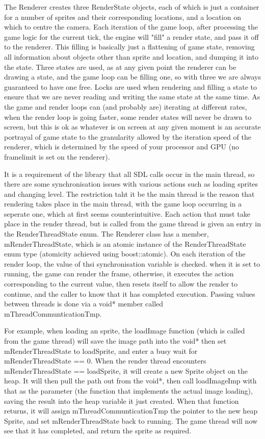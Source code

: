     The Renderer creates three RenderState objects, each of which is just a container for a number of sprites and their corresponding locations, and a location on which to centre the camera.
    Each iteration of the game loop, after processing the game logic for the current tick, the engine will "fill" a render state, and pass it off to the renderer. This filling is basically just a flattening of game state, removing all information about objects other than sprite and location, and dumping it into the state.
    Three states are used, as at any given point the renderer can be drawing a state, and the game loop can be filling one, so with three we are always guaranteed to have one free.
    Locks are used when rendering and filling a state to ensure that we are never reading and writing the same state at the same time.
    As the game and render loops can (and probably are) iterating at different rates, when the render loop is going faster, some render states will never be drawn to screen, but this is ok as whatever is on screen at any given moment is an accurate portrayal of game state to the granularity allowed by the iteration speed of the renderer, which is determined by the speed of your processor and GPU (no framelimit is set on the renderer).
    
    \mbox{}
    
    It is a requirement of the library that all SDL calls occur in the main thread, so there are some synchronisation issues with various actions such as loading sprites and changing level. The restriction taht it be the main thread is the reason that rendering takes place in the main thread, with the game loop occurring in a seperate one, which at first seems counterintuitive.
    Each action that must take place in the render thread, but is called from the game thread is given an entry in the RenderThreadState enum. The Renderer class has a member, mRenderThreadState, which is an atomic instance of the RenderThreadState enum type (atomicity achieved using boost::atomic). On each iteration of the render loop, the value of thsi synchronisation variable is checked. when it is set to running, the game can render the frame, otherwise, it executes the action corresponding to the current value, then resets itself to allow the render to continue, and the caller to know that it has completed execution. Passing values between threads is done via a void* member called mThreadCommunticationTmp.
    
    For example, when loading an sprite, the loadImage function (which is called from the game thread) will save the image path into the void* then set mRenderThreadState to loadSprite, and enter a busy wait for mRenderThreadState == 0.
    When the render thread encounters mRenderThreadState == loadSprite, it will create a new Sprite object on the heap. It will then pull the path out from  the void*, then call loadImageImp with that as the parameter (the function that implements the actual image loading), saving the result into the heap variable it just created.
    When that function returns, it will assign mThreadCommunticationTmp the pointer to the new heap Sprite, and set mRenderThreadState back to running.
    The game thread will now see that it has completed, and return the sprite as required.
        

